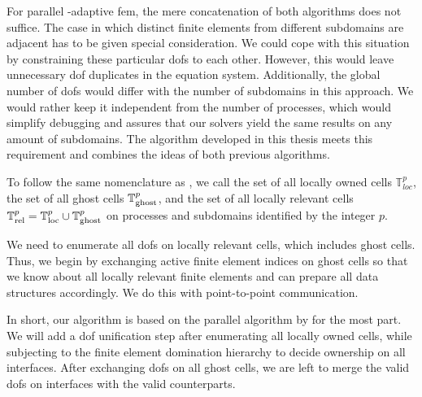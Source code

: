 For parallel \hp-adaptive \gls{fem}, the mere concatenation of both algorithms does not suffice. The case in which distinct finite elements from different subdomains are adjacent has to be given special consideration. We could cope with this situation by constraining these particular \glspl{dof} to each other. However, this would leave unnecessary \gls{dof} duplicates in the equation system. Additionally, the global number of \glspl{dof} would differ with the number of subdomains in this approach. We would rather keep it independent from the number of processes, which would simplify debugging and assures that our solvers yield the same results on any amount of subdomains. The algorithm developed in this thesis meets this requirement and combines the ideas of both previous algorithms.

To follow the same nomenclature as \cite{bangerth2012}, we call the set of all locally owned cells $\mathbb{T}^p_{loc}$, the set of all ghost cells $\mathbb{T}^p_{\text{ghost}}$, and the set of all locally relevant cells $\mathbb{T}^p_{\text{rel}} = \mathbb{T}^p_{\text{loc}} \cup \mathbb{T}^p_{\text{ghost}}$ on processes and subdomains identified by the integer $p$.

We need to enumerate all \glspl{dof} on locally relevant cells, which includes ghost cells. Thus, we begin by exchanging active finite element indices on ghost cells so that we know about all locally relevant finite elements and can prepare all data structures accordingly. We do this with point-to-point communication.

In short, our algorithm is based on the parallel algorithm by \textcite{bangerth2012} for the most part. We will add a \gls{dof} unification step after enumerating all locally owned cells, while subjecting to the finite element domination hierarchy to decide ownership on all interfaces. After exchanging \glspl{dof} on all ghost cells, we are left to merge the valid \glspl{dof} on interfaces with the valid counterparts.

